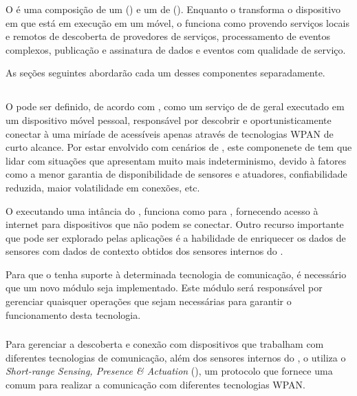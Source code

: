 O \mhubcddl é uma composição de um \gateway (\mhub) e um \middleware de \iomt (\cddl). Enquanto o \mhub transforma o dispositivo \android em que está em execução em um \gateway \iot móvel, o \cddl funciona como \middleware provendo serviços locais e remotos de descoberta de provedores de serviços, processamento de eventos complexos, publicação e assinatura de dados e eventos com qualidade de serviço.

As seções seguintes abordarão cada um desses componentes separadamente.

\subsection{\mhub}

O \middleware \mhub pode ser definido, de acordo com , como um serviço de \middleware de \iomt geral executado em um dispositivo móvel pessoal, responsável por descobrir e oportunisticamente conectar à uma miríade de \smartobjs acessíveis apenas através de tecnologias WPAN de curto alcance. Por estar envolvido com cenários de \iomt, este componenete de \software tem que lidar com situações que apresentam muito mais indeterminismo, devido à fatores como a menor garantia de disponibilidade de sensores e atuadores, confiabilidade reduzida, maior volatilidade em conexões, etc.

O \smartphone executando uma intância do \mhub, funciona como \gateway para \smartobjs, fornecendo acesso à internet para dispositivos que não podem se conectar. Outro recurso importante que pode ser explorado pelas aplicações é a habilidade de enriquecer os dados de sensores com dados de contexto obtidos dos sensores internos do \mhub.

Para que o \mhub tenha suporte à determinada tecnologia de comunicação, é necessário que um novo módulo seja implementado. Este módulo será responsável por gerenciar quaisquer operações que sejam necessárias para garantir o funcionamento desta tecnologia.

\subsubsection{\stwopa}

Para gerenciar a descoberta e conexão com dispositivos que trabalham com diferentes tecnologias de comunicação, além dos sensores internos do \smartphone, o \mhub utiliza o \textit{Short-range Sensing, Presence \& Actuation} (\stwopa), um protocolo que fornece uma \api comum para realizar a comunicação com diferentes tecnologias WPAN.

